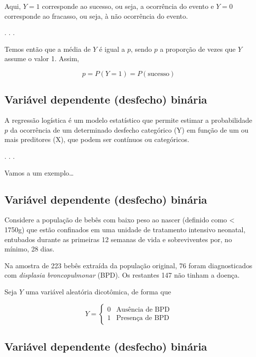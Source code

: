 \documentclass[
  letterpaper,
  DIV=11,
  numbers=noendperiod]{scrartcl}
\begin{document}
Aqui, \(Y = 1\) corresponde ao sucesso, ou seja, a ocorrência do evento
e \(Y = 0\) corresponde ao fracasso, ou seja, à não ocorrência do
evento.

. . .

Temos então que a média de \(Y\) é igual a \(p\), sendo \(p\) a
proporção de vezes que \(Y\) assume o valor 1. Assim,

\[p = P(Y=1) = P(\text{sucesso})\]

\subsection{Variável dependente (desfecho)
binária}\label{variuxe1vel-dependente-desfecho-binuxe1ria-1}

A regressão logística é um modelo estatístico que permite estimar a
probabilidade \(p\) da ocorrência de um determinado desfecho categórico
(Y) em função de um ou mais preditores (X), que podem ser contínuos ou
categóricos.

. . .

Vamos a um exemplo\ldots{}

\subsection{Variável dependente (desfecho)
binária}\label{variuxe1vel-dependente-desfecho-binuxe1ria-2}

Considere a população de bebês com baixo peso ao nascer (definido como
\textless{} 1750g) que estão confinados em uma unidade de tratamento
intensivo neonatal, entubados durante as primeiras 12 semanas de vida e
sobreviventes por, no mínimo, 28 dias.

Na amostra de 223 bebês extraída da população original, 76 foram
diagnosticados com \emph{displasia broncopulmonar} (BPD). Os restantes
147 não tinham a doença.

Seja \(Y\) uma variável aleatória dicotômica, de forma que

\[Y = \begin{cases} 0 & \text{Ausência de BPD} \\ 1 & \text{Presença de BPD} \end{cases}\]

\subsection{Variável dependente (desfecho)
binária}\label{variuxe1vel-dependente-desfecho-binuxe1ria-3}
\end{document}
